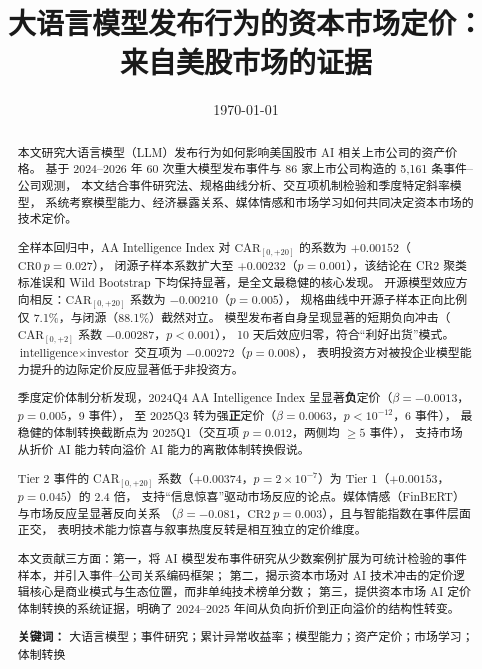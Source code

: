 \documentclass[11pt,fontset=fandol,a4paper]{ctexart}
\title{\textbf{大语言模型发布行为的资本市场定价：\\
来自美股市场的证据}}
\author{}
\date{\today}
\begin{document}
\maketitle

\begin{abstract}
\noindent
本文研究大语言模型（LLM）发布行为如何影响美国股市 AI 相关上市公司的资产价格。
基于 2024--2026 年 60 次重大模型发布事件与 86 家上市公司构造的 5{,}161 条事件--公司观测，
本文结合事件研究法、规格曲线分析、交互项机制检验和季度特定斜率模型，
系统考察模型能力、经济暴露关系、媒体情感和市场学习如何共同决定资本市场的技术定价。

全样本回归中，AA Intelligence Index 对 $\text{CAR}_{[0,+20]}$ 的系数为 $+0.00152$（$\text{CR0}\ p=0.027$），
闭源子样本系数扩大至 $+0.00232$（$p=0.001$），该结论在 CR2 聚类标准误和 Wild Bootstrap 下均保持显著，是全文最稳健的核心发现。
开源模型效应方向相反：$\text{CAR}_{[0,+20]}$ 系数为 $-0.00210$（$p=0.005$），
规格曲线中开源子样本正向比例仅 7.1\%，与闭源（88.1\%）截然对立。
模型发布者自身呈现显著的短期负向冲击（$\text{CAR}_{[0,+2]}$ 系数 $-0.00287$，$p<0.001$），
10 天后效应归零，符合``利好出货''模式。$\text{intelligence}\times\text{investor}$ 交互项为 $-0.00272$（$p=0.008$），
表明投资方对被投企业模型能力提升的边际定价反应显著低于非投资方。

季度定价体制分析发现，2024Q4 AA Intelligence Index 呈显著\textbf{负}定价（$\beta=-0.0013$，$p=0.005$，9 事件），
至 2025Q3 转为强\textbf{正}定价（$\beta=0.0063$，$p<10^{-12}$，6 事件），
最稳健的体制转换截断点为 2025Q1（交互项 $p=0.012$，两侧均 $\geq5$ 事件），
支持市场从折价 AI 能力转向溢价 AI 能力的离散体制转换假说。

Tier 2 事件的 CAR$_{[0,+20]}$ 系数（$+0.00374$，$p=2\times10^{-7}$）为 Tier 1（$+0.00153$，$p=0.045$）的 2.4 倍，
支持``信息惊喜''驱动市场反应的论点。媒体情感（FinBERT）与市场反应呈显著反向关系
（$\beta=-0.081$，$\text{CR2}\ p=0.003$），且与智能指数在事件层面正交，
表明技术能力惊喜与叙事热度反转是相互独立的定价维度。

本文贡献三方面：第一，将 AI 模型发布事件研究从少数案例扩展为可统计检验的事件样本，并引入事件--公司关系编码框架；
第二，揭示资本市场对 AI 技术冲击的定价逻辑核心是商业模式与生态位置，而非单纯技术榜单分数；
第三，提供资本市场 AI 定价体制转换的系统证据，明确了 2024--2025 年间从负向折价到正向溢价的结构性转变。

\smallskip
\noindent\textbf{关键词：} 大语言模型；事件研究；累计异常收益率；模型能力；资产定价；市场学习；体制转换
\end{abstract}
\end{document}
